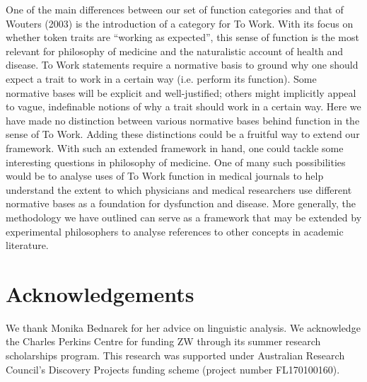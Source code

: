 \documentclass{article}
\begin{document}
One of the main differences between our set of function categories and that of Wouters (2003) is the introduction of a category for To Work.
With its focus on whether token traits are ``working as expected'', this sense of function is the most relevant for philosophy of medicine and the naturalistic account of health and disease.
To Work statements require a normative basis to ground why one should expect a trait to work in a certain way (i.e. perform its function).
Some normative bases will be explicit and well-justified; others might implicitly appeal to vague, indefinable notions of why a trait should work in a certain way.
Here we have made no distinction between various normative bases behind function in the sense of To Work.
Adding these distinctions could be a fruitful way to extend our framework.
With such an extended framework in hand, one could tackle some interesting questions in philosophy of medicine.
One of many such possibilities would be to analyse uses of To Work function in medical journals to help understand the extent to which physicians and medical researchers use different normative bases as a foundation for dysfunction and disease.
More generally, the methodology we have outlined can serve as a framework that may be extended by experimental philosophers to analyse references to other concepts in academic literature.

\section{Acknowledgements}
\label{sec:acknowledgements}

We thank Monika Bednarek for her advice on linguistic analysis.
We acknowledge the Charles Perkins Centre for funding ZW through its summer research scholarships program.
This research was supported under Australian Research Council's Discovery Projects funding scheme (project number FL170100160).



\end{document}
